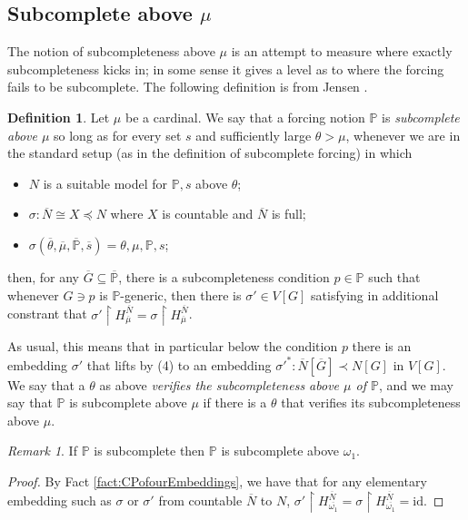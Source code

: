 \documentclass{amsart}
\theoremstyle{definition}
\newtheorem{definition}[theorem]{Definition}
\theoremstyle{remark}
\newtheorem{remark}[theorem]{Remark}
\renewcommand{\P}{\mathbb{P}}
\newcommand{\N}{{\overline{N}}}
\newcommand{\G}{\overline{G}}
\newcommand{\rest}{\mathbin{\upharpoonright}}
\begin{document}
\subsection{Subcomplete above $\mu$} \label{subsec:subcompleteabovemu}
The notion of subcompleteness above $\mu$ is an attempt to measure where exactly subcompleteness kicks in; in some sense it gives a level as to where the forcing fails to be subcomplete. 
The following definition is from Jensen \cite[Ch.~2 p.\ 47]{Jensen:2009fe}.
\begin{definition} 
Let $\mu$ be a cardinal. We say that a forcing notion $\P$ is \emph{subcomplete above $\mu$} so long as for every set $s$ and sufficiently large $\theta > \mu$, whenever we are in the standard setup (as in the definition of subcomplete forcing) in which \begin{itemize}
	\item $N$ is a suitable model for $\P, s$ above $\theta$;
	\item $\sigma:\N \cong X \preccurlyeq N$ where $X$ is countable and $\N$ is full;
	\item $\sigma(\overline{\theta}, \overline{\mu}, \overline{\P}, \overline s)=\theta, \mu, \P, s$;
\end{itemize}	
then, for any $\G \subseteq \overline{\P}$, there is a subcompleteness condition $p \in \P$ such that whenever $G \ni p$ is $\P$-generic, then there is $\sigma' \in V[G]$ satisfying in additional constrant that $\sigma' \rest H_{\overline \mu}^{\N} = \sigma \rest H_{\overline \mu}^{\N}$.

As usual, this means that in particular below the condition $p$ there is an embedding $\sigma'$ that lifts by (4) to an embedding $\sigma'^*:\N[\G] \prec N[G]$ in $V[G]$. We say that a $\theta$ as above \textit{verifies the subcompleteness above $\mu$ of $\P$}, and we may say that $\P$ is subcomplete above \(\mu\) if there is a $\theta$ that verifies its subcompleteness above $\mu$.
\end{definition}

\begin{remark} \label{remark:scaboveomega1} If $\P$ is subcomplete then $\P$ is subcomplete above $\omega_1$. \end{remark}
\begin{proof} By Fact \ref{fact:CPofourEmbeddings}, we have that for any elementary embedding such as $\sigma$ or $\sigma'$ from countable $\N$ to $N$, $\sigma' \rest H_{\overline{\omega_1}}^{\N} = \sigma \rest H_{\overline{\omega_1}}^{\N} = \text{id}$. \end{proof}
\end{document}
